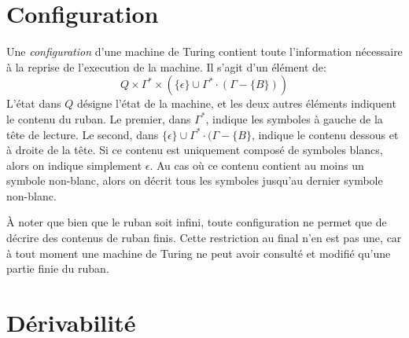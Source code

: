 \section{Configuration}

Une \og \textit{configuration} \fg{} d'une machine de Turing contient toute l'information nécessaire à la reprise de l'execution de la machine.
Il s'agit d'un élément de:
\[
Q \times \Gamma^* \times (\{ \epsilon \} \cup \Gamma^* \cdot (\Gamma - \{ B \}))
\]
L'état dans $Q$ désigne l'état de la machine, et les deux autres éléments indiquent le contenu du ruban.
Le premier, dans $\Gamma^*$, indique les symboles à gauche de la tête de lecture.
Le second, dans $\{ \epsilon \} \cup \Gamma^* \cdot (\Gamma - \{ B \}$, indique le contenu dessous et à droite de la tête.
Si ce contenu est uniquement composé de symboles blancs, alors on indique simplement $\epsilon$.
Au cas où ce contenu contient au moins un symbole non-blanc, alors on décrit tous les symboles jusqu'au dernier symbole non-blanc.

À noter que bien que le ruban soit infini, toute configuration ne permet que de décrire des contenus de ruban finis.
Cette restriction au final n'en est pas une, car à tout moment une machine de Turing ne peut avoir consulté et modifié qu'une partie finie du ruban.

\section{Dérivabilité}

